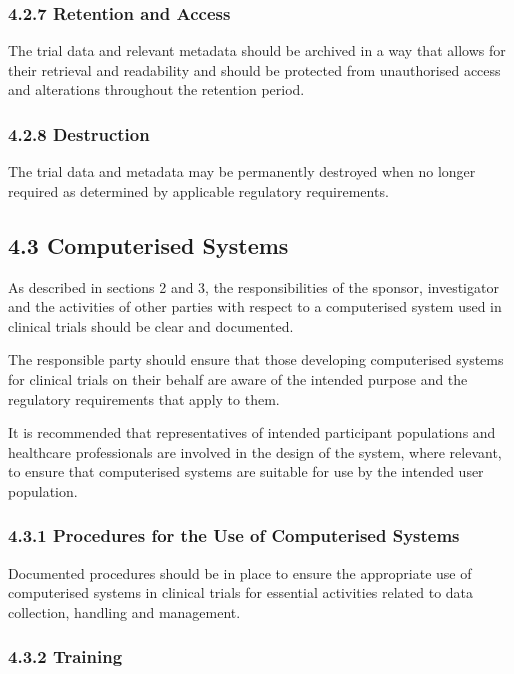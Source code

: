 \documentclass[11pt]{article}
\begin{document}
\subsubsection{4.2.7 Retention and Access}

The trial data and relevant metadata should be archived in a way that allows for their retrieval and readability and should be protected from unauthorised access and alterations throughout the retention period.


\subsubsection{4.2.8 Destruction}

The trial data and metadata may be permanently destroyed when no longer required as determined by applicable regulatory requirements.


\subsection{4.3 Computerised Systems}

As described in sections 2 and 3, the responsibilities of the sponsor, investigator and the activities of other parties with respect to a computerised system used in clinical trials should be clear and documented.


The responsible party should ensure that those developing computerised systems for clinical trials on their behalf are aware of the intended purpose and the regulatory requirements that apply to them.


It is recommended that representatives of intended participant populations and healthcare professionals are involved in the design of the system, where relevant, to ensure that computerised systems are suitable for use by the intended user population.


\subsubsection{4.3.1 Procedures for the Use of Computerised Systems}

Documented procedures should be in place to ensure the appropriate use of computerised systems in clinical trials for essential activities related to data collection, handling and management.


\subsubsection{4.3.2 Training}
\end{document}
